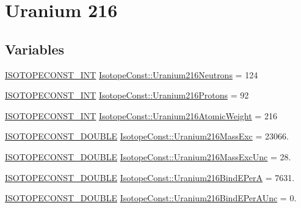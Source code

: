 \hypertarget{group___isotope_const-_uranium-_u216}{}\section{Uranium 216}
\label{group___isotope_const-_uranium-_u216}
\subsection*{Variables}
\begin{DoxyCompactItemize}
\item 
\mbox{\hyperlink{group___isotope_const-_macros_ga5f18360b3e99483a35c32d789e62621c}{I\+S\+O\+T\+O\+P\+E\+C\+O\+N\+S\+T\+\_\+\+I\+NT}} \mbox{\hyperlink{group___isotope_const-_uranium-_u216_gaf8dd16bcbf31c45f88bd2f010a6db7d0}{Isotope\+Const\+::\+Uranium216\+Neutrons}} = 124
\item 
\mbox{\hyperlink{group___isotope_const-_macros_ga5f18360b3e99483a35c32d789e62621c}{I\+S\+O\+T\+O\+P\+E\+C\+O\+N\+S\+T\+\_\+\+I\+NT}} \mbox{\hyperlink{group___isotope_const-_uranium-_u216_gaa842d67da815b4ae48f64603a741bf4d}{Isotope\+Const\+::\+Uranium216\+Protons}} = 92
\item 
\mbox{\hyperlink{group___isotope_const-_macros_ga5f18360b3e99483a35c32d789e62621c}{I\+S\+O\+T\+O\+P\+E\+C\+O\+N\+S\+T\+\_\+\+I\+NT}} \mbox{\hyperlink{group___isotope_const-_uranium-_u216_ga4cecb2d2bff3522be35a8a8ca037406c}{Isotope\+Const\+::\+Uranium216\+Atomic\+Weight}} = 216
\item 
\mbox{\hyperlink{group___isotope_const-_macros_ga8f45a7272ce02c0b4c65c44636ed719a}{I\+S\+O\+T\+O\+P\+E\+C\+O\+N\+S\+T\+\_\+\+D\+O\+U\+B\+LE}} \mbox{\hyperlink{group___isotope_const-_uranium-_u216_gaf07ffb974b38f54929b777d3899dbed9}{Isotope\+Const\+::\+Uranium216\+Mass\+Exc}} = 23066.
\item 
\mbox{\hyperlink{group___isotope_const-_macros_ga8f45a7272ce02c0b4c65c44636ed719a}{I\+S\+O\+T\+O\+P\+E\+C\+O\+N\+S\+T\+\_\+\+D\+O\+U\+B\+LE}} \mbox{\hyperlink{group___isotope_const-_uranium-_u216_ga189f4d691a701772b61c86e86a82af78}{Isotope\+Const\+::\+Uranium216\+Mass\+Exc\+Unc}} = 28.
\item 
\mbox{\hyperlink{group___isotope_const-_macros_ga8f45a7272ce02c0b4c65c44636ed719a}{I\+S\+O\+T\+O\+P\+E\+C\+O\+N\+S\+T\+\_\+\+D\+O\+U\+B\+LE}} \mbox{\hyperlink{group___isotope_const-_uranium-_u216_ga2100ada28100311be1eaa2bb52344116}{Isotope\+Const\+::\+Uranium216\+Bind\+E\+PerA}} = 7631.
\item 
\mbox{\hyperlink{group___isotope_const-_macros_ga8f45a7272ce02c0b4c65c44636ed719a}{I\+S\+O\+T\+O\+P\+E\+C\+O\+N\+S\+T\+\_\+\+D\+O\+U\+B\+LE}} \mbox{\hyperlink{group___isotope_const-_uranium-_u216_gae2cfbb9715483ed2a5fd83ead8ff181e}{Isotope\+Const\+::\+Uranium216\+Bind\+E\+Per\+A\+Unc}} = 0.

\end{DoxyCompactItemize}
